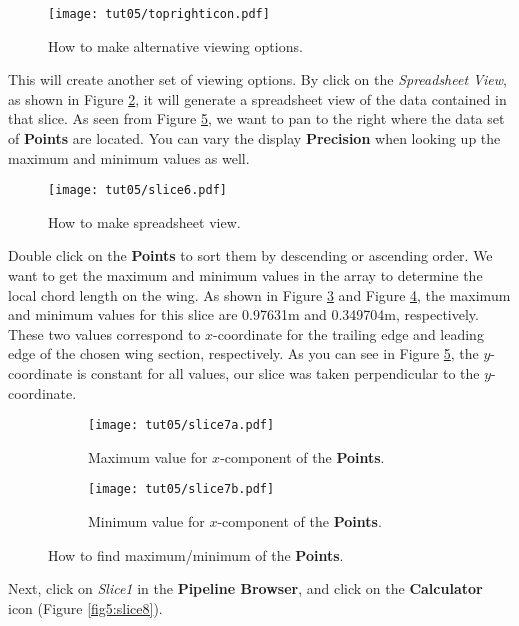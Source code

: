 \begin{figure}[htbp]
    \centering
    \texttt{[image: tut05/toprighticon.pdf]}
    \caption{How to make alternative viewing options.}
    \label{fig5:toprighticon}
\end{figure}
This will create another set of viewing options. By click on the \textit{Spreadsheet View}, as shown in Figure \ref{fig5:slice6}, it will generate a spreadsheet view of the data contained in that slice. As seen from Figure \ref{fig5:slice7}, we want to pan to the right where the data set of \textbf{Points} are located. You can vary the display \textbf{Precision} when looking up the maximum and minimum values as well.
\begin{figure}[htbp]
    \centering
    \texttt{[image: tut05/slice6.pdf]}
    \caption{How to make spreadsheet view.}
    \label{fig5:slice6}
\end{figure}
Double click on the \textbf{Points} to sort them by descending or ascending order. We want to get the maximum and minimum values in the array to determine the local chord length on the wing. As shown in Figure \ref{fig5:slice7 a} and Figure \ref{fig5:slice7 b}, the maximum and minimum values for this slice are 0.97631m and 0.349704m, respectively. These two values correspond to $x$-coordinate for the trailing edge and leading edge of the chosen wing section, respectively. As you can see in Figure \ref{fig5:slice7}, the $y$-coordinate is constant for all values, our slice was taken perpendicular to the $y$-coordinate.
\begin{figure}[htbp]
    \centering
     \begin{subfigure}[b]{.85\textwidth}
         \centering
         \texttt{[image: tut05/slice7a.pdf]}
         \caption{Maximum value for $x$-component of the \textbf{Points}.}
         \label{fig5:slice7 a}
     \end{subfigure}
     \hfill
     \begin{subfigure}[b]{.85\textwidth}
         \centering
         \texttt{[image: tut05/slice7b.pdf]}
         \caption{Minimum value for $x$-component of the \textbf{Points}.}
         \label{fig5:slice7 b}
     \end{subfigure}     
    \caption{How to find maximum/minimum of the \textbf{Points}.}
    \label{fig5:slice7}
\end{figure}
Next, click on \textit{Slice1} in the \textbf{Pipeline Browser}, and click on the \textbf{Calculator} icon (Figure \ref{fig5:slice8}).
